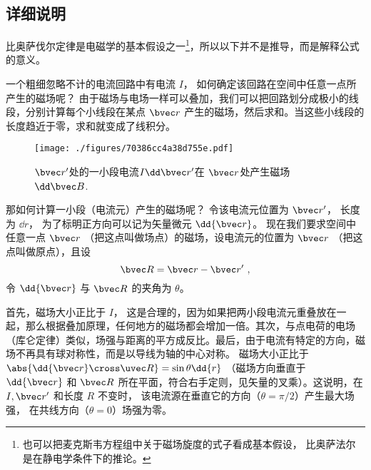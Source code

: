 \subsection{详细说明}
比奥萨伐尔定律是电磁学的基本假设之一\footnote{也可以把麦克斯韦方程组中关于磁场旋度的式子看成基本假设， 比奥萨法尔是在静电学条件下的推论。}，所以以下并不是推导，而是解释公式的意义。

一个粗细忽略不计的电流回路中有电流 $I$， 如何确定该回路在空间中任意一点所产生的磁场呢？ 由于磁场与电场一样可以叠加，我们可以把回路划分成极小的线段，分别计算每个小线段在某点 $\bvec r$ 产生的磁场，然后求和。当这些小线段的长度趋近于零，求和就变成了线积分。

\begin{figure}[ht]
\centering
\texttt{[image: ./figures/70386cc4a38d755e.pdf]}
\caption{$\bvec r'$处的一小段电流$I \dd \bvec r'$在 $\bvec r$处产生磁场 $\dd \bvec B$.} \label{fig_BioSav_3}
\end{figure}

那如何计算一小段（电流元）产生的磁场呢？ 令该电流元位置为 $\bvec r'$， 长度为 $\dd{r}$， 为了标明正方向可以记为矢量微元 $\dd{\bvec r}$。 现在我们要求空间中任意一点 $\bvec r$ （把这点叫做场点）的磁场，设电流元的位置为 $\bvec r$ （把这点叫做原点），且设
\begin{equation}
\bvec R = \bvec r - \bvec r'~,
\end{equation}
令 $\dd{\bvec r}$ 与 $\bvec R$ 的夹角为 $\theta$。

首先，磁场大小正比于 $I$， 这是合理的，因为如果把两小段电流元重叠放在一起，那么根据叠加原理，任何地方的磁场都会增加一倍。其次，与点电荷的电场（库仑定律）类似，场强与距离的平方成反比。最后，由于电流有特定的方向，磁场不再具有球对称性，而是以导线为轴的中心对称。 磁场大小正比于 $\abs{\dd{\bvec r} \cross \uvec R} = \sin\theta \dd{r}$ （磁场方向垂直于 $\dd{\bvec r}$ 和 $\bvec R$ 所在平面，符合右手定则，见矢量的叉乘）。这说明，在 $I, \bvec r'$ 和长度 $R$ 不变时， 该电流源在垂直它的方向（$\theta  = \pi /2$）产生最大场强， 在共线方向（$\theta  = 0$）场强为零。

